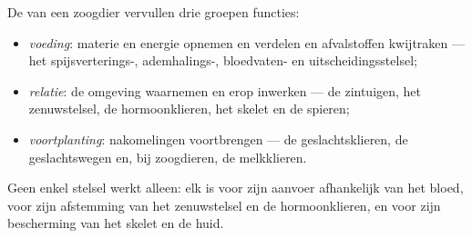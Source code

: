 \begin{proposition}\label{prop:b1:mammal-organization:functions}
De  van een zoogdier vervullen drie groepen functies:
\begin{itemize}
  \item \emph{voeding}: materie en energie opnemen
        en verdelen en afvalstoffen kwijtraken --- het spijsverterings-,
        ademhalings-, bloedvaten- en uitscheidingsstelsel;
  \item \emph{relatie}: de omgeving waarnemen en
        erop inwerken --- de zintuigen, het zenuwstelsel, de
        hormoonklieren, het skelet en de spieren;
  \item \emph{voortplanting}: nakomelingen
        voortbrengen --- de geslachtsklieren, de geslachtswegen en, bij
        zoogdieren, de melkklieren.
\end{itemize}
Geen enkel stelsel werkt alleen: elk  is voor zijn aanvoer afhankelijk
van het bloed, voor zijn afstemming van het zenuwstelsel en de hormoonklieren,
en voor zijn bescherming van het skelet en de huid.
\end{proposition}

